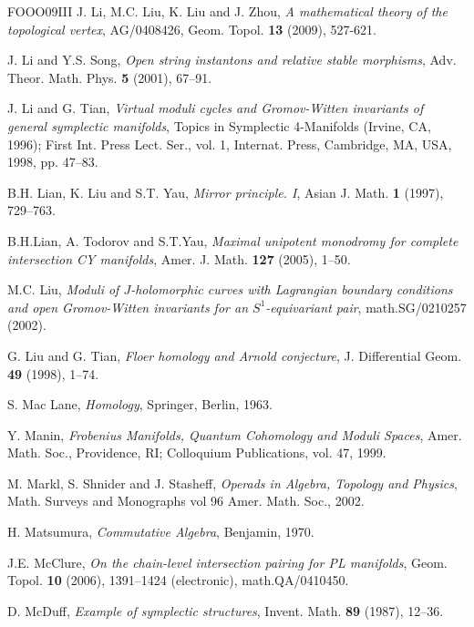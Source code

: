 \begin{thebibliography}{FOOO09III}
 J. Li, M.C. Liu, K. Liu and J. Zhou, \emph{A mathematical theory of the topological vertex}, AG/0408426, Geom. Topol. \textbf{13} (2009), 527-621.

 J. Li and Y.S. Song, \emph{Open string instantons and relative stable morphisms}, Adv. Theor. Math. Phys. \textbf{5} (2001), 67–91.

 J. Li and G. Tian, \emph{Virtual moduli cycles and Gromov-Witten invariants of general symplectic manifolds}, Topics in Symplectic 4-Manifolds (Irvine, CA, 1996); First Int. Press Lect. Ser., vol. 1, Internat. Press, Cambridge, MA, USA, 1998, pp. 47–83.

 B.H. Lian, K. Liu and S.T. Yau, \emph{Mirror principle. I}, Asian J. Math. \textbf{1} (1997), 729–763.

 B.H.Lian, A. Todorov and S.T.Yau, \emph{Maximal unipotent monodromy for complete intersection CY manifolds}, Amer. J. Math. \textbf{127} (2005), 1–50.

 M.C. Liu, \emph{Moduli of \(J\)-holomorphic curves with Lagrangian boundary conditions and open Gromov-Witten invariants for an \(S^1\)-equivariant pair}, math.SG/0210257 (2002).

 G. Liu and G. Tian, \emph{Floer homology and Arnold conjecture}, J. Differential Geom. \textbf{49} (1998), 1–74.

 S. Mac Lane, \emph{Homology}, Springer, Berlin, 1963.

 Y. Manin, \emph{Frobenius Manifolds, Quantum Cohomology and Moduli Spaces}, Amer. Math. Soc., Providence, RI; Colloquium Publications, vol. 47, 1999.

 M. Markl, S. Shnider and J. Stasheff, \emph{Operads in Algebra, Topology and Physics}, Math. Surveys and Monographs vol 96 Amer. Math. Soc., 2002.

 H. Matsumura, \emph{Commutative Algebra}, Benjamin, 1970.

 J.E. McClure, \emph{On the chain-level intersection pairing for PL manifolds}, Geom. Topol. \textbf{10} (2006), 1391–1424 (electronic), math.QA/0410450.

 D. McDuff, \emph{Example of symplectic structures}, Invent. Math. \textbf{89} (1987), 12–36.


\end{thebibliography}
